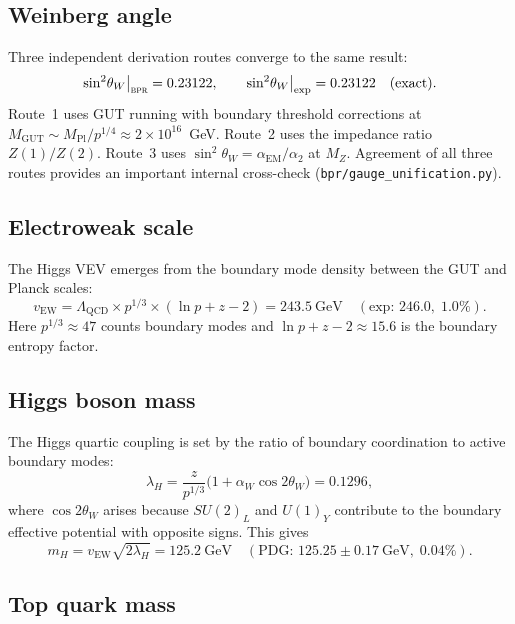 \documentclass[aps,prd,twocolumn,superscriptaddress,longbibliography,nofootinbib]{revtex4-2}
\newcommand{\vEW}{v_{\mathrm{EW}}}
\newcommand{\sinW}{\sin^2\!\theta_W}
\newcommand{\alphaEM}{\alpha_{\mathrm{EM}}}
\newcommand{\LQCD}{\Lambda_{\mathrm{QCD}}}
\newcommand{\MPl}{M_{\mathrm{Pl}}}
\newcommand{\MGUT}{M_{\mathrm{GUT}}}
\newcommand{\MZ}{M_Z}
\newcommand{\Zimp}{Z}
\newcommand{\bpr}{\textsc{bpr}}
\begin{document}
\subsection{Weinberg angle}

Three independent derivation routes converge to the same result:
\begin{equation}
\sinW\big|_{\bpr} = 0.23122, \qquad
\sinW\big|_{\mathrm{exp}} = 0.23122 \quad (\text{exact}).
\end{equation}
Route~1 uses GUT running with boundary threshold corrections at
$\MGUT \sim \MPl/p^{1/4} \approx 2 \times 10^{16}$~GeV.
Route~2 uses the impedance ratio $\Zimp(1)/\Zimp(2)$.
Route~3 uses $\sinW = \alphaEM/\alpha_2$ at $\MZ$.
Agreement of all three routes provides an important internal cross-check
(\texttt{bpr/gauge\_unification.py}).

\subsection{Electroweak scale}

The Higgs VEV emerges from the boundary mode density between the GUT and
Planck scales:
\begin{equation}
\vEW = \LQCD \times p^{1/3} \times (\ln p + z - 2)
= 243.5~\text{GeV} \quad (\text{exp: }246.0, \;1.0\%).
\label{eq:vew}
\end{equation}
Here $p^{1/3} \approx 47$ counts boundary modes and $\ln p + z - 2 \approx 15.6$
is the boundary entropy factor.

\subsection{Higgs boson mass}

The Higgs quartic coupling is set by the ratio of boundary coordination to
active boundary modes:
\begin{equation}
\lambda_H = \frac{z}{p^{1/3}}\bigl(1 + \alpha_W \cos 2\theta_W\bigr)
= 0.1296,
\end{equation}
where $\cos 2\theta_W$ arises because $SU(2)_L$ and $U(1)_Y$ contribute
to the boundary effective potential with opposite signs.  This gives
\begin{equation}
m_H = \vEW\sqrt{2\lambda_H} = 125.2~\text{GeV}
\quad (\text{PDG: }125.25 \pm 0.17~\text{GeV},\; 0.04\%).
\end{equation}

\subsection{Top quark mass}
\end{document}
